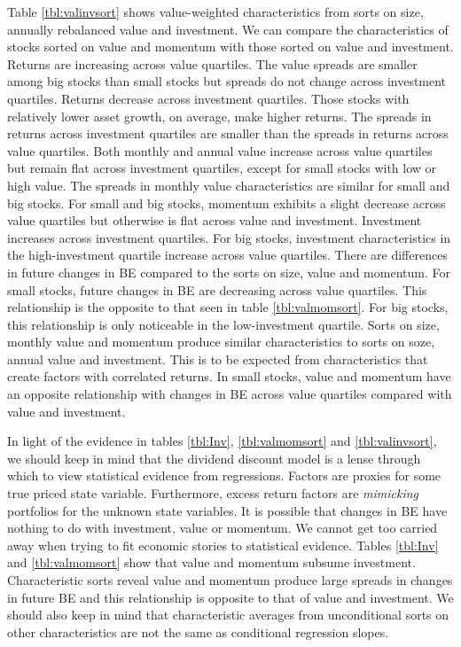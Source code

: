 Table \ref{tbl:valinvsort} shows value-weighted characteristics from sorts on size,
annually rebalanced value and investment. We can compare the characteristics of stocks
sorted on value and momentum with those sorted on value and investment. Returns are
increasing across value quartiles. The value spreads are smaller among big stocks than
small stocks but spreads do not change across investment quartiles. Returns decrease
across investment quartiles. Those stocks with relatively lower asset growth, on average,
make higher returns. The spreads in returns across investment quartiles are smaller than
the spreads in returns across value quartiles. Both monthly and annual value increase
across value quartiles but remain flat across investment quartiles, except for small
stocks with low or high value. The spreads in monthly value characteristics are similar
for small and big stocks. For small and big stocks, momentum exhibits a slight decrease
across value quartiles but otherwise is flat across value and investment. Investment
increases across investment quartiles. For big stocks, investment characteristics in the
high-investment quartile increase across value quartiles. There are differences in future
changes in BE compared to the sorts on size, value and momentum. For small stocks, future
changes in BE are decreasing across value quartiles. This relationship is the opposite to
that seen in table \ref{tbl:valmomsort}. For big stocks, this relationship is only
noticeable in the low-investment quartile. Sorts on size, monthly value and momentum
produce similar characteristics to sorts on soze, annual value and investment. This is to
be expected from characteristics that create factors with correlated returns. In small
stocks, value and momentum have an opposite relationship with changes in BE across value
quartiles compared with value and investment.

In light of the evidence in tables \ref{tbl:Inv}, \ref{tbl:valmomsort} and
\ref{tbl:valinvsort}, we should keep in mind that the dividend discount model is a lense
through which to view statistical evidence from regressions. Factors are proxies for some
true priced state variable. Furthermore, excess return factors are \emph{mimicking}
portfolios for the unknown state variables. It is possible that changes in BE have nothing
to do with investment, value or momentum. We cannot get too carried away when trying to
fit economic stories to statistical evidence. Tables \ref{tbl:Inv} and
\ref{tbl:valmomsort} show that value and momentum subsume investment. Characteristic sorts
reveal value and momentum produce large spreads in changes in future BE and this
relationship is opposite to that of value and investment. We should also keep in mind that
characteristic averages from unconditional sorts on other characteristics are not the
same as conditional regression slopes.
